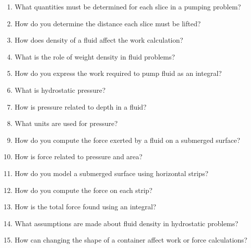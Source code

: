 \begin{enumerate}
  \item What quantities must be determined for each slice in a pumping problem?
  \item How do you determine the distance each slice must be lifted?
  \item How does density of a fluid affect the work calculation?
  \item What is the role of weight density in fluid problems?
  \item How do you express the work required to pump fluid as an integral?
  \item What is hydrostatic pressure?
  \item How is pressure related to depth in a fluid?
  \item What units are used for pressure?
  \item How do you compute the force exerted by a fluid on a submerged surface?
  \item How is force related to pressure and area?
  \item How do you model a submerged surface using horizontal strips?
  \item How do you compute the force on each strip?
  \item How is the total force found using an integral?
  \item What assumptions are made about fluid density in hydrostatic problems?
  \item How can changing the shape of a container affect work or force calculations?
\end{enumerate}
